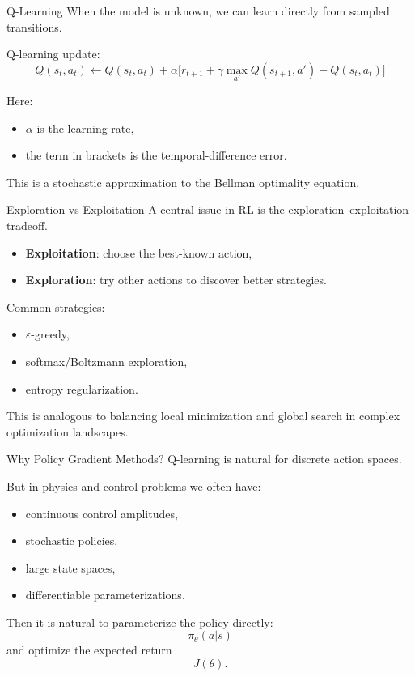 \documentclass{beamer}
\begin{document}
\begin{frame}{Q-Learning}
  When the model is unknown, we can learn directly from sampled transitions.

  Q-learning update:
  \[
  Q(s_t,a_t)\leftarrow Q(s_t,a_t) +
  \alpha\Big[r_{t+1}+\gamma \max_{a'}Q(s_{t+1},a')-Q(s_t,a_t)\Big]
  \]

  Here:
  \begin{itemize}
  \item $\alpha$ is the learning rate,
  \item the term in brackets is the temporal-difference error.
  \end{itemize}

  This is a stochastic approximation to the Bellman optimality equation.
\end{frame}

\begin{frame}{Exploration vs Exploitation}
  A central issue in RL is the exploration--exploitation tradeoff.

  \begin{itemize}
  \item \textbf{Exploitation}: choose the best-known action,
  \item \textbf{Exploration}: try other actions to discover better strategies.
  \end{itemize}

  Common strategies:
  \begin{itemize}
  \item $\varepsilon$-greedy,
  \item softmax/Boltzmann exploration,
  \item entropy regularization.
  \end{itemize}

  This is analogous to balancing local minimization and global search in complex optimization landscapes.
\end{frame}

\begin{frame}{Why Policy Gradient Methods?}
  Q-learning is natural for discrete action spaces.

  But in physics and control problems we often have:
  \begin{itemize}
  \item continuous control amplitudes,
  \item stochastic policies,
  \item large state spaces,
  \item differentiable parameterizations.
  \end{itemize}

  Then it is natural to parameterize the policy directly:
  \[
  \pi_\theta(a|s)
  \]
  and optimize the expected return
  \[
  J(\theta).
  \]
\end{frame}
\end{document}
